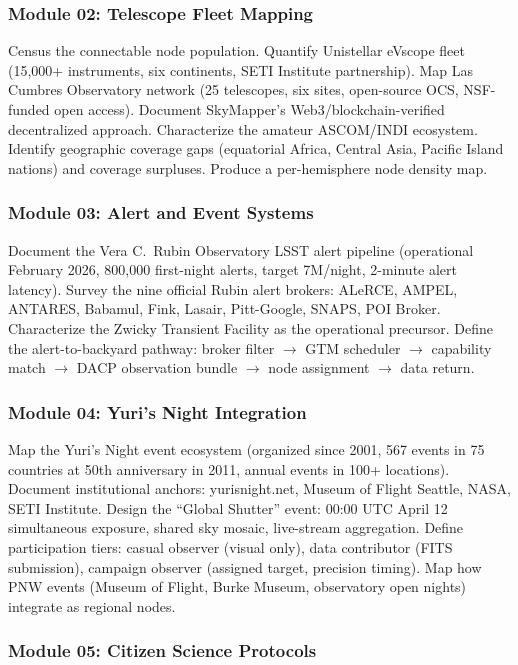 \documentclass[11pt,letterpaper]{article}
\begin{document}
\subsubsection{Module 02: Telescope Fleet Mapping}

Census the connectable node population. Quantify Unistellar eVscope fleet (15,000+ instruments, six continents, SETI Institute partnership). Map Las Cumbres Observatory network (25 telescopes, six sites, open-source OCS, NSF-funded open access). Document SkyMapper's Web3/blockchain-verified decentralized approach. Characterize the amateur ASCOM/INDI ecosystem. Identify geographic coverage gaps (equatorial Africa, Central Asia, Pacific Island nations) and coverage surpluses. Produce a per-hemisphere node density map.

\subsubsection{Module 03: Alert and Event Systems}

Document the Vera C.\ Rubin Observatory LSST alert pipeline (operational February 2026, 800,000 first-night alerts, target 7M/night, 2-minute alert latency). Survey the nine official Rubin alert brokers: ALeRCE, AMPEL, ANTARES, Babamul, Fink, Lasair, Pitt-Google, SNAPS, POI Broker. Characterize the Zwicky Transient Facility as the operational precursor. Define the alert-to-backyard pathway: broker filter $\rightarrow$ GTM scheduler $\rightarrow$ capability match $\rightarrow$ DACP observation bundle $\rightarrow$ node assignment $\rightarrow$ data return.

\subsubsection{Module 04: Yuri's Night Integration}

Map the Yuri's Night event ecosystem (organized since 2001, 567 events in 75 countries at 50th anniversary in 2011, annual events in 100+ locations). Document institutional anchors: yurisnight.net, Museum of Flight Seattle, NASA, SETI Institute. Design the ``Global Shutter'' event: 00:00 UTC April 12 simultaneous exposure, shared sky mosaic, live-stream aggregation. Define participation tiers: casual observer (visual only), data contributor (FITS submission), campaign observer (assigned target, precision timing). Map how PNW events (Museum of Flight, Burke Museum, observatory open nights) integrate as regional nodes.

\subsubsection{Module 05: Citizen Science Protocols}
\end{document}
